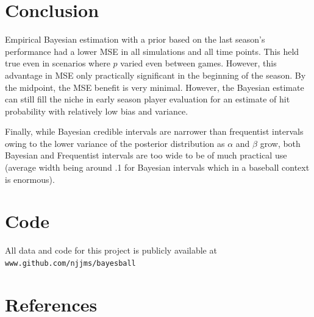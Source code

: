 \documentclass[10pt,a4paper]{article}
\begin{document}
\section{Conclusion}
Empirical Bayesian estimation with a prior based on the last season's performance had a lower MSE in all simulations and all time points.
This held true even in scenarios where $p$ varied even between games.
However, this advantage in MSE only practically significant in the beginning of the season.
By the midpoint, the MSE benefit is very minimal.
However, the Bayesian estimate can still fill the niche in early season player evaluation for an estimate of hit probability with relatively low bias and variance.

Finally, while Bayesian credible intervals are narrower than frequentist intervals owing to the lower variance of the posterior distribution as $\alpha$ and $\beta$ grow, both Bayesian and Frequentist intervals are too wide to be of much practical use (average width being around .1 for Bayesian intervals which in a baseball context is enormous).

\section{Code}
All data and code for this project is publicly available at \texttt{www.github.com/njjms/bayesball}

\section{References}
\printbibliography
\end{document}
